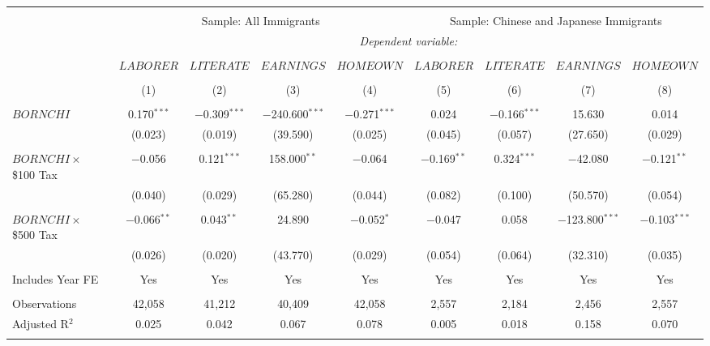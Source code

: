 
\begin{tabular}{@{\extracolsep{5pt}}lcccccccc} 
\\[-1.8ex]\hline 
\hline \\[-1.8ex] 
 & \multicolumn{4}{c}{Sample: All Immigrants} & \multicolumn{4}{c}{Sample: Chinese and Japanese Immigrants} \\ 
 & \multicolumn{8}{c}{\textit{Dependent variable:}} \\ 
\cline{2-9} 
\\[-1.8ex] & $LABORER$ & $LITERATE$ & $EARNINGS$ & $HOMEOWN$ & $LABORER$ & $LITERATE$ & $EARNINGS$ & $HOMEOWN$ \\ 
\\[-1.8ex] & (1) & (2) & (3) & (4) & (5) & (6) & (7) & (8)\\ 
\hline \\[-1.8ex] 
 $BORNCHI$ & 0.170$^{***}$ & $-$0.309$^{***}$ & $-$240.600$^{***}$ & $-$0.271$^{***}$ & 0.024 & $-$0.166$^{***}$ & 15.630 & 0.014 \\ 
  & (0.023) & (0.019) & (39.590) & (0.025) & (0.045) & (0.057) & (27.650) & (0.029) \\ 
  & & & & & & & & \\ 
 $BORNCHI \times$ \$100 Tax & $-$0.056 & 0.121$^{***}$ & 158.000$^{**}$ & $-$0.064 & $-$0.169$^{**}$ & 0.324$^{***}$ & $-$42.080 & $-$0.121$^{**}$ \\ 
  & (0.040) & (0.029) & (65.280) & (0.044) & (0.082) & (0.100) & (50.570) & (0.054) \\ 
  & & & & & & & & \\ 
 $BORNCHI \times$ \$500 Tax & $-$0.066$^{**}$ & 0.043$^{**}$ & 24.890 & $-$0.052$^{*}$ & $-$0.047 & 0.058 & $-$123.800$^{***}$ & $-$0.103$^{***}$ \\ 
  & (0.026) & (0.020) & (43.770) & (0.029) & (0.054) & (0.064) & (32.310) & (0.035) \\ 
  & & & & & & & & \\ 
Includes Year FE & Yes & Yes & Yes & Yes & Yes & Yes & Yes & Yes \\ 
\hline \\[-1.8ex] 
Observations & 42,058 & 41,212 & 40,409 & 42,058 & 2,557 & 2,184 & 2,456 & 2,557 \\ 
Adjusted R$^{2}$ & 0.025 & 0.042 & 0.067 & 0.078 & 0.005 & 0.018 & 0.158 & 0.070 \\ 
\hline \\[-1.8ex] 
\end{tabular} 
